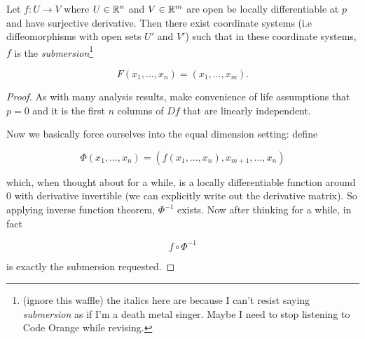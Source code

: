 \documentclass[11pt]{scrartcl}
\begin{document}
\begin{theorem}
Let $f : U \rightarrow V$ where $U \in \mathbb R^n$ and $V \in \mathbb R^m$ are open be locally differentiable at $p$ and have surjective derivative. Then there exist coordinate systems (i.e diffeomorphisms with open sets $U'$ and $V'$) such that in these coordinate systems, $f$ is the \textit{submersion}\footnote{(ignore this waffle) the italics here are because I can't resist saying \textit{submersion} as if I'm a death metal singer. Maybe I need to stop listening to Code Orange while revising.}

\begin{equation}
F(x_1, ... , x_n) = (x_1, ... , x_m).    
\end{equation}

\begin{proof}
As with many analysis results, make convenience of life assumptions that $p=0$ and it is the first $n$ columns of $Df$ that are linearly independent. 

Now we basically force ourselves into the equal dimension setting: define

\begin{equation}
    \Phi(x_1, ... , x_n) = (f(x_1, ... , x_n), x_{m+1}, ... , x_n)
\end{equation}

which, when thought about for a while, is a locally differentiable function around 0 with derivative invertible (we can explicitly write out the derivative matrix). So applying inverse function theorem, $\Phi^{-1}$ exists. Now after thinking for a while, in fact 

\begin{equation}
    f \circ \Phi^{-1}
\end{equation}

is exactly the submersion requested.
\end{proof}
\end{theorem}
\end{document}
